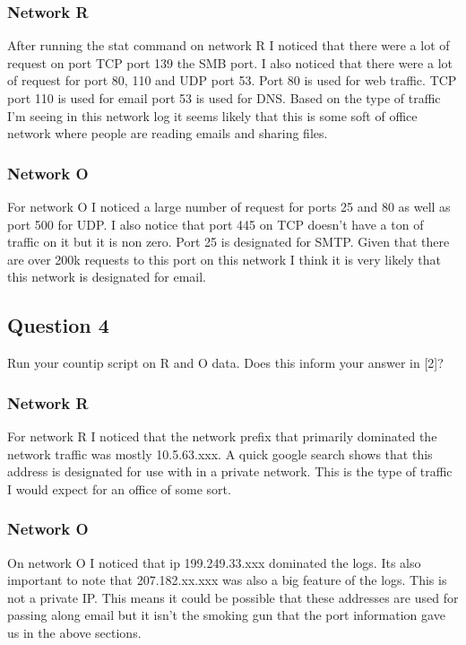 \documentclass[letterpaper, onecolumn,10pt]{IEEEtran}
\begin{document}
		        \subsubsection{Network R}
		        After running the stat command on network R I noticed that there were a lot of request on port TCP port 139 the SMB port. I also noticed that there were a lot of request for port 80, 110 and UDP port 53. Port 80 is used for web traffic. TCP port 110 is used for email port 53 is used for DNS. Based on the type of traffic I'm seeing in this network log it seems likely that this is some soft of office network where people are reading emails and sharing files.\\
		        
		        \subsubsection{Network O}
		        For network O I noticed a large number of request for ports 25 and 80 as well as port 500 for UDP. I also notice that port 445 on TCP doesn't have a ton of traffic on it but it is non zero. Port 25 is designated for SMTP. Given that there are over 200k requests to this port on this network I think it is very likely that this network is designated for email.\\
		        
		    \subsection{Question 4}
		    Run your countip script on R and O data.  Does this inform your answer in [2]?
		        \subsubsection{Network R}
		        For network R I noticed that the network prefix that primarily dominated the network traffic was mostly 10.5.63.xxx. A quick google search shows that this address is designated for use with in a private network. This is the type of traffic I would expect for an office of some sort.\\
		        
		        \subsubsection{Network O}
		        On network O I noticed that ip 199.249.33.xxx dominated the logs. Its also important to note that 207.182.xx.xxx was also a big feature of the logs. This is not a private IP. This means it could be possible that these addresses are used for passing along email but it isn't the smoking gun that the port information gave us in the above sections.\\
		        
\end{document}
